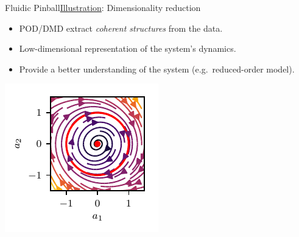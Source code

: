 \documentclass[usenames,dvipsnames,svgnames,10pt,aspectratio=169]{beamer}
\begin{document}
\begin{frame}[t, c]{Fluidic Pinball}{\underline{Illustration}: Dimensionality reduction}
	\begin{minipage}{.48\textwidth}
		\begin{itemize}
			\item POD/DMD extract \emph{coherent structures} from the data.
			\bigskip
			\item Low-dimensional representation of the system's dynamics.
			\bigskip
			\item Provide a better understanding of the system (e.g.\ reduced-order model).
		\end{itemize}
	\end{minipage}%
	\hfill
	\begin{minipage}{.48\textwidth}
		\centering
		\includegraphics[width=.8\textwidth]{pinball_phase_plane}
	\end{minipage}

	\vspace{1cm}
\end{frame}
\end{document}
